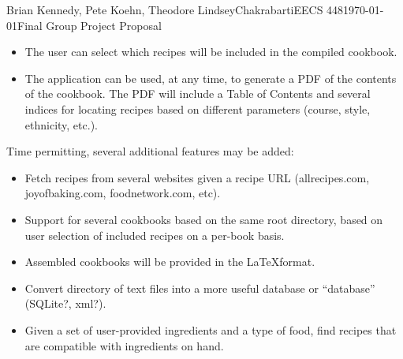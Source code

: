 \documentclass{article}
\begin{document}
\begin{mla}{Brian Kennedy, Pete Koehn, Theodore Lindsey}{}{Chakrabarti}{EECS 448}{\today}{Final Group Project Proposal}
\begin{itemize}
\item The user can select which recipes will be included in the compiled cookbook.

\item The application can be used, at any time, to generate a PDF of the contents of the cookbook. The PDF will include a Table of Contents and several indices for locating recipes based on different parameters (course, style, ethnicity, etc.).
\end{itemize}

\noindent Time permitting, several additional features may be added:

\begin{itemize}

\item Fetch recipes from several websites given a recipe URL (allrecipes.com, joyofbaking.com, foodnetwork.com, etc).

\item Support for several cookbooks based on the same root directory, based on user selection of included recipes on a per-book basis.

\item Assembled cookbooks will be provided in the \LaTeX format.

\item Convert directory of text files into a more useful database or “database” (SQLite?, xml?).

\item Given a set of user-provided ingredients and a type of food, find recipes that are compatible with ingredients on hand.
\end{itemize}




\end{mla}
\end{document}
